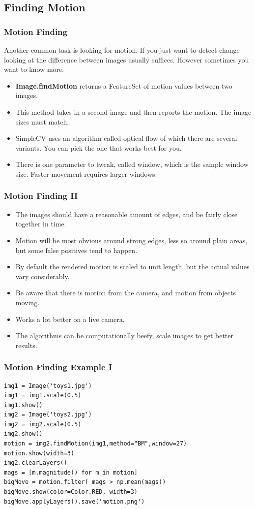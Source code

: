 \documentclass{beamer}
\begin{document}
\subsection{Finding Motion}
\begin{frame}
  \frametitle{Motion Finding}
Another common task is looking for motion. If you just want to detect
change looking at the difference between images usually
suffices. However sometimes you want to know more.
\begin{itemize}
\item \textbf{Image.findMotion} returns a FeatureSet of motion values
  between two images.
\item This method takes in a second image and then reports the
  motion. The image sizes must match. 
\item SimpleCV uses an algorithm called optical flow of which there
  are several variants. You can pick the one that works best for you.
\item There is one parameter to tweak, called window, which is the
  sample window size. Faster movement requires larger windows.
 
\end{itemize}
\end{frame}
\begin{frame}
  \frametitle{Motion Finding II}
\begin{itemize}
\item The images should have a reasonable amount of edges, and be
  fairly close together in time. 
\item Motion will be most obvious around strong edges, less so
around plain areas, but some false positives tend to happen.
\item By default the rendered motion is scaled to unit length, but the
  actual values vary considerably.  
\item Be aware that there is motion from the camera, and motion from
objects moving. 
\item Works a lot better on a live camera.
\item The algorithms can be computationally beefy, scale images to get
  better results. 
\end{itemize}
\end{frame}
\begin{frame}[fragile] 
\frametitle{Motion Finding Example I}
\begin{example}
\begin{verbatim}
img1 = Image('toys1.jpg')
img1 = img1.scale(0.5)
img1.show()
img2 = Image('toys2.jpg')
img2 = img2.scale(0.5)
img2.show()
motion = img2.findMotion(img1,method="BM",window=27)
motion.show(width=3)
img2.clearLayers()
mags = [m.magnitude() for m in motion]
bigMove = motion.filter( mags > np.mean(mags))
bigMove.show(color=Color.RED, width=3)
bigMove.applyLayers().save('motion.png')
\end{verbatim}
\end{example}
\end{frame} 
\end{document}
